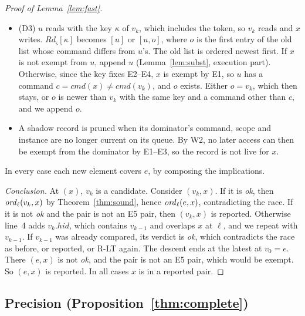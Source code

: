 \begin{proof}[Proof of Lemma~\ref{lem:fast}]
\begin{itemize}
  shadows $v_k$.
\item (D3) $u$ reads with the key $\kappa$ of $v_k$, which includes the token, so $v_k$ reads and $x$ writes. $\mathit{Rd}_\varsigma[\kappa]$
  becomes $[u]$ or $[u, o]$, where $o$ is the first entry of the old list whose command differs from $u$'s. The old list
  is ordered newest first. If $x$ is not exempt from $u$, append $u$ (Lemma~\ref{lem:subst}, execution part). Otherwise,
  since the key fixes E2--E4, $x$ is exempt by E1, so $u$ has a command $c = \mathit{cmd}(x) \ne
  \mathit{cmd}(v_k)$, and $o$ exists. Either $o = v_k$, which then stays, or $o$ is newer than $v_k$ with the
  same key and a command other than $c$, and we append $o$.
\item A shadow record is pruned when its dominator's command, scope and instance are no longer current on its queue.
  By W2, no later access can then be exempt from the dominator by E1--E3, so the record is not live for $x$.
\end{itemize}
In every case each new element covers $e$, by composing the implications.

\emph{Conclusion.} At $(x)$, $v_k$ is a candidate. Consider $(v_k,x)$. If it is \emph{ok},
then $\mathit{ord}_{\ell}(v_k,x)$ by Theorem~\ref{thm:sound}, hence $\mathit{ord}_{\ell}(e,x)$, contradicting the race. If it is not
\emph{ok} and the pair is not an E5 pair, then $(v_k,x)$ is reported. Otherwise line~4 adds
$v_k.\mathit{hid}$, which contains $v_{k-1}$ and overlaps $x$ at $\ell$, and we repeat with $v_{k-1}$. If $v_{k-1}$
was already compared, its verdict is \emph{ok}, which contradicts the race as before, or reported, or R-LT again. The
descent ends at the latest at $v_0 = e$. There $(e,x)$ is not \emph{ok}, and the pair is not an
E5 pair, which would be exempt. So $(e,x)$ is reported. In all cases $x$ is in a reported pair.
\end{proof}

\subsection{Precision (Proposition~\ref{thm:complete})}
\label{app:precision}

